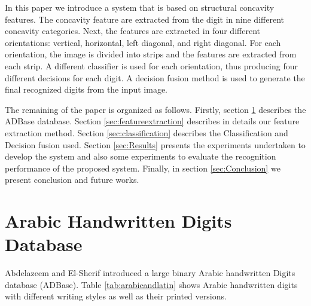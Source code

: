 \documentclass[conference]{IEEEtran}
\begin{document}
In this paper we introduce a system that is based on structural concavity features. The concavity feature are extracted from the digit in nine different concavity categories. Next, the features are extracted in four different orientations: vertical, horizontal, left diagonal, and right diagonal. For each orientation, the image is divided into strips and the features are extracted from each strip. A different classifier is used for each orientation, thus producing four different decisions for each digit. A decision fusion method is used to generate the final recognized digits from the input image.


The remaining of the paper is organized as follows. Firstly, section \ref{sec:section2} describes the ADBase database. Section \ref{sec:featureextraction} describes in details our feature extraction method. Section \ref{sec:classification} describes the Classification and Decision fusion used. Section \ref{sec:Results} presents the experiments undertaken to develop the system and also some experiments to evaluate the recognition performance of the proposed system. Finally, in section \ref{sec:Conclusion} we present conclusion and future works.


\section{Arabic Handwritten Digits Database}
\label{sec:section2}

 Abdelazeem and El-Sherif \cite{IjdarSherifPaper}introduced a large binary Arabic handwritten Digits database (ADBase). Table \ref{tab:arabicandlatin} shows Arabic handwritten digits with different writing styles as well as their printed versions.
\end{document}
